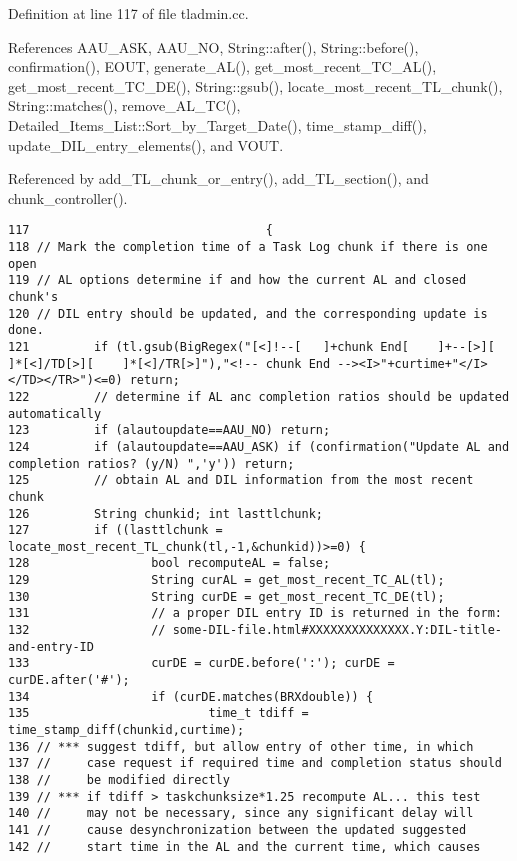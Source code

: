 Definition at line 117 of file tladmin.cc.

References AAU\_\-ASK, AAU\_\-NO, String::after(), String::before(), confirmation(), EOUT, generate\_\-AL(), get\_\-most\_\-recent\_\-TC\_\-AL(), get\_\-most\_\-recent\_\-TC\_\-DE(), String::gsub(), locate\_\-most\_\-recent\_\-TL\_\-chunk(), String::matches(), remove\_\-AL\_\-TC(), Detailed\_\-Items\_\-List::Sort\_\-by\_\-Target\_\-Date(), time\_\-stamp\_\-diff(), update\_\-DIL\_\-entry\_\-elements(), and VOUT.

Referenced by add\_\-TL\_\-chunk\_\-or\_\-entry(), add\_\-TL\_\-section(), and chunk\_\-controller().



\footnotesize\begin{verbatim}117                                 {
118 // Mark the completion time of a Task Log chunk if there is one open
119 // AL options determine if and how the current AL and closed chunk's
120 // DIL entry should be updated, and the corresponding update is done.
121         if (tl.gsub(BigRegex("[<]!--[   ]+chunk End[    ]+--[>][        ]*[<]/TD[>][    ]*[<]/TR[>]"),"<!-- chunk End --><I>"+curtime+"</I></TD></TR>")<=0) return;
122         // determine if AL anc completion ratios should be updated automatically
123         if (alautoupdate==AAU_NO) return;
124         if (alautoupdate==AAU_ASK) if (confirmation("Update AL and completion ratios? (y/N) ",'y')) return;
125         // obtain AL and DIL information from the most recent chunk
126         String chunkid; int lasttlchunk;
127         if ((lasttlchunk = locate_most_recent_TL_chunk(tl,-1,&chunkid))>=0) {
128                 bool recomputeAL = false;
129                 String curAL = get_most_recent_TC_AL(tl);
130                 String curDE = get_most_recent_TC_DE(tl);
131                 // a proper DIL entry ID is returned in the form:
132                 // some-DIL-file.html#XXXXXXXXXXXXXX.Y:DIL-title-and-entry-ID
133                 curDE = curDE.before(':'); curDE = curDE.after('#');
134                 if (curDE.matches(BRXdouble)) {
135                         time_t tdiff = time_stamp_diff(chunkid,curtime);
136 // *** suggest tdiff, but allow entry of other time, in which
137 //     case request if required time and completion status should
138 //     be modified directly
139 // *** if tdiff > taskchunksize*1.25 recompute AL... this test
140 //     may not be necessary, since any significant delay will
141 //     cause desynchronization between the updated suggested
142 //     start time in the AL and the current time, which causes

\end{verbatim}
